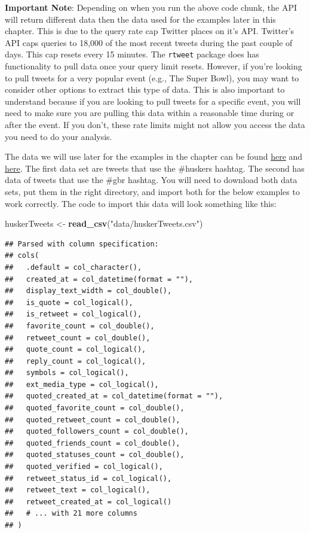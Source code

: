 \documentclass[]{book}
\newenvironment{Shaded}{\begin{snugshade}}{\end{snugshade}}
\newcommand{\KeywordTok}[1]{\textcolor[rgb]{0.13,0.29,0.53}{\textbf{#1}}}
\newcommand{\NormalTok}[1]{#1}
\newcommand{\StringTok}[1]{\textcolor[rgb]{0.31,0.60,0.02}{#1}}
\begin{document}
\textbf{Important Note}: Depending on when you run the above code chunk, the API will return different data then the data used for the examples later in this chapter. This is due to the query rate cap Twitter places on it's API. Twitter's API caps queries to 18,000 of the most recent tweets during the past couple of days. This cap resets every 15 minutes. The \texttt{rtweet} package does has functionality to pull data once your query limit resets. However, if you're looking to pull tweets for a very popular event (e.g., The Super Bowl), you may want to consider other options to extract this type of data. This is also important to understand because if you are looking to pull tweets for a specific event, you will need to make sure you are pulling this data within a reasonable time during or after the event. If you don't, these rate limits might not allow you access the data you need to do your analysis.

The data we will use later for the examples in the chapter can be found \href{https://unl.box.com/s/x4jjifc394gxfvsvbwb3csez2ne4l4rb}{here} and \href{https://unl.box.com/s/s4ej8khwi9ah9qvqpi2jviqomfocie3n}{here}. The first data set are tweets that use the \#huskers hashtag. The second has data of tweets that use the \#gbr hashtag. You will need to download both data sets, put them in the right directory, and import both for the below examples to work correctly. The code to import this data will look something like this:

\begin{Shaded}
\begin{Highlighting}[]
\NormalTok{huskerTweets <-}\StringTok{ }\KeywordTok{read_csv}\NormalTok{(}\StringTok{"data/huskerTweets.csv"}\NormalTok{)}
\end{Highlighting}
\end{Shaded}

\begin{verbatim}
## Parsed with column specification:
## cols(
##   .default = col_character(),
##   created_at = col_datetime(format = ""),
##   display_text_width = col_double(),
##   is_quote = col_logical(),
##   is_retweet = col_logical(),
##   favorite_count = col_double(),
##   retweet_count = col_double(),
##   quote_count = col_logical(),
##   reply_count = col_logical(),
##   symbols = col_logical(),
##   ext_media_type = col_logical(),
##   quoted_created_at = col_datetime(format = ""),
##   quoted_favorite_count = col_double(),
##   quoted_retweet_count = col_double(),
##   quoted_followers_count = col_double(),
##   quoted_friends_count = col_double(),
##   quoted_statuses_count = col_double(),
##   quoted_verified = col_logical(),
##   retweet_status_id = col_logical(),
##   retweet_text = col_logical(),
##   retweet_created_at = col_logical()
##   # ... with 21 more columns
## )
\end{verbatim}
\end{document}
